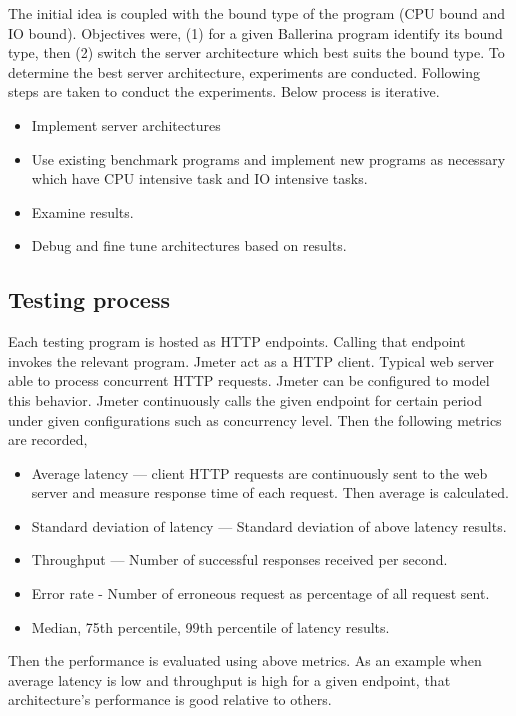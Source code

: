 The initial idea is coupled with the bound type of the program (CPU bound and IO bound). Objectives were, (1) for a given Ballerina program identify its bound type, then (2) switch the server architecture which best suits the bound type. To determine the best  server architecture, experiments are conducted. Following steps are taken to conduct the experiments. Below process is iterative.

\begin{itemize}
	\item Implement server architectures
	\item Use existing benchmark programs and implement new programs as necessary which have CPU intensive task and IO intensive tasks.
	\item Examine results.
	\item Debug and fine tune architectures based on results.
\end{itemize} 

\subsection{Testing process}

Each testing program is hosted as HTTP endpoints. Calling that endpoint invokes the relevant program. Jmeter act as a HTTP client. Typical web server able to process concurrent HTTP requests. Jmeter can be configured to model this behavior. Jmeter continuously calls the given endpoint for certain period under given configurations such as concurrency level. Then the following metrics are recorded,

\begin{itemize}
	\item Average latency — client HTTP requests are continuously sent to the web server and measure response time of each request. Then average is calculated.
	\item Standard deviation of latency — Standard deviation of above latency results.
	\item Throughput — Number of successful responses received per second.
	\item Error rate - Number of erroneous request as percentage of all request sent.
	\item Median, 75th percentile, 99th percentile of latency results.
\end{itemize} 

Then the performance is evaluated using above metrics. As an example when average latency is low and throughput is high for a given endpoint, that architecture's performance is good relative to others.
  

